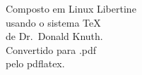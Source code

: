 \newpage
\thispagestyle{empty}

\vspace*{\fill}
	\begin{flushright}
	{\large 
	Composto em Linux Libertine\\
	usando o sistema \TeX{}\\
	de Dr.~Donald Knuth. \\
	Convertido para .pdf \\
	pelo pdflatex.\\}
	\end{flushright}
